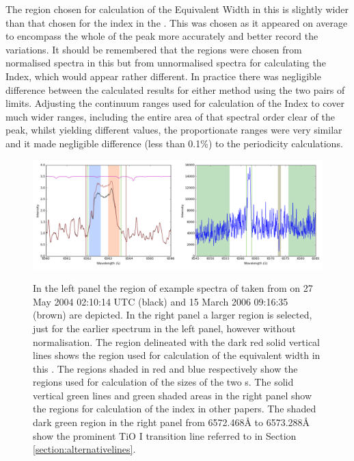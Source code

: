 The region chosen for calculation of the {\ha} Equivalent Width in this {\paperorthesis} is slightly wider than that
chosen for the {\ha} index in the \citet{suarezmascareno15}. This was chosen as it appeared on average to encompass the
whole of the {\ha} peak more accurately and better record the variations. It should be remembered that the regions were
chosen from normalised spectra in this {\paperorthesis} but from unnormalised spectra for calculating the {\ha} Index,
which would appear rather different. In practice there was negligible difference between the calculated results for
either method using the two pairs of limits. Adjusting the continuum ranges used for calculation of the {\ha} Index to
cover much wider ranges, including the entire area of that spectral order clear of the {\ha} peak, whilst yielding
different values, the proportionate ranges were very similar and it made negligible difference (less than 0.1\%) to the
periodicity calculations.

\begin{figure}[!htbp]
\begin{center}
\includegraphics[scale=0.25]{Figures/harpsfirstha4.png} \\
\end{center}   
\caption{In the left panel the {\ha} region of example spectra of {\prox} taken from {\harps} on 27 May 2004 02:10:14
  UTC (black) and 15 March 2006 09:16:35 (brown) are depicted. In the right panel a larger region is selected, just for
  the earlier spectrum in the left panel, however without normalisation. The region delineated with the dark red solid
  vertical lines shows the region used for calculation of the {\ha} equivalent width in this \paperorthesis. The regions
  shaded in red and blue respectively show the regions used for calculation of the sizes of the two \horn s. The solid
  vertical green lines and green shaded areas in the right panel show the regions for calculation of the {\ha} index in
  other papers. The shaded dark green region in the right panel from 6572.468{\AA} to 6573.288{\AA} show the prominent
  TiO I transition line referred to in Section \ref{section:alternativelines}.
}
 \protect\label{fig:harpsfirstha}
\end{figure}

